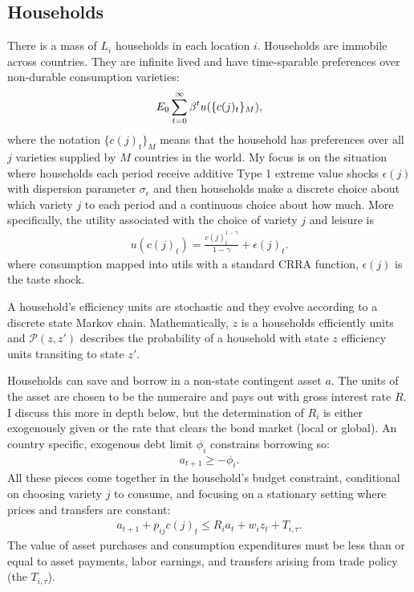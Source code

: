 \documentclass[12pt,pdftex]{article}
\begin{document}
\begin{onehalfspacing}
\subsection{Households}

There is a mass of $L_i$ households in each location $i$. Households are immobile across countries. They are infinite lived and have time-sparable preferences over non-durable consumption varieties:
\begin{align}
\small
E_{0} \sum_{t = 0}^{\infty} \beta^{t} u( \{ c(j)_t \}_{M}),
\end{align}
where the notation $\{ c(j)_t \}_{M}$ means that the household has preferences over all $j$ varieties supplied by $M$ countries in the world. My focus is on the situation where households each period receive additive Type 1 extreme value shocks $\epsilon(j)$ with dispersion parameter $\sigma_{\epsilon}$ and then households make a discrete choice about which variety $j$ to each period and a continuous choice about how much. More specifically, the utility associated with the choice of variety $j$ and leisure is
\begin{align}
u( c(j)_t ) =  \frac{ c(j)_t ^{1-\gamma}}{1- \gamma} + \epsilon(j)_t. \label{eq:utility}
\end{align}
where consumption mapped into utils with a standard CRRA function, $\epsilon(j)$ is the taste shock.

A household's efficiency units are stochastic and they evolve according to a discrete state Markov chain. Mathematically, $z$ is a households efficiently units and $\mathcal{P}(z,z')$ describes the probability of a household with state $z$ efficiency units transiting to state $z'$.

Households can save and borrow in a non-state contingent asset $a$. The units of the asset are chosen to be the numeraire and pays out with gross interest rate $R$. I discuss this more in depth below, but the determination of $R_{i}$ is either exogenously given or the rate that clears the bond market (local or global). An country specific, exogenous debt limit $\phi_{i}$ constrains borrowing so:
\begin{align}
a_{t+1} \geq - \phi_{i}.
\label{eq:borrowing-constraint}
\end{align}
All these pieces come together in the household's budget constraint, conditional on choosing variety $j$ to consume, and focusing on a stationary setting where prices and transfers are constant:
\begin{align}
a_{t+1} + p_{ij}c(j)_{t}  \leq    R_{i} a_{t} + w_{i} z_{t} + T_{i,\tau}.\label{eq:trade-budget-constraint}
\end{align}
The value of asset purchases and consumption expenditures must be less than or equal to asset payments, labor earnings, and transfers arising from trade policy (the $T_{i,\tau}$).


\end{onehalfspacing}
\end{document}
